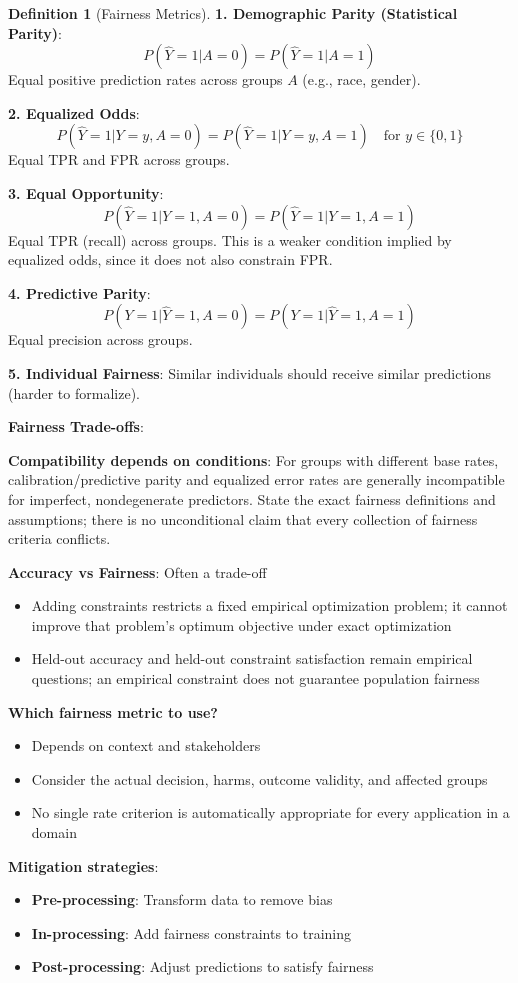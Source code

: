 \documentclass[11pt,twoside]{article}
\numberwithin{equation}{section}
\theoremstyle{plain}
\theoremstyle{definition}
\newtheorem{definition}[theorem]{Definition}
\theoremstyle{remark}
\newenvironment{keyidea}{
  \begin{tcolorbox}[colback=yellow!5!white,
                    colframe=yellow!50!black,
                    title=Key Idea,
                    breakable,
                    enhanced,
                    sharp corners,
                    boxrule=0.8pt,
                    left=6pt, right=6pt, top=6pt, bottom=6pt]
}{
  \end{tcolorbox}
}
\begin{document}
\begin{definition}[Fairness Metrics]

\textbf{1. Demographic Parity (Statistical Parity)}:
\[
P(\hat{Y} = 1 | A = 0) = P(\hat{Y} = 1 | A = 1)
\]
Equal positive prediction rates across groups $A$ (e.g., race, gender).

\textbf{2. Equalized Odds}:
\[
P(\hat{Y} = 1 | Y = y, A = 0) = P(\hat{Y} = 1 | Y = y, A = 1) \quad \text{for } y \in \{0, 1\}
\]
Equal TPR and FPR across groups.

\textbf{3. Equal Opportunity}:
\[
P(\hat{Y} = 1 | Y = 1, A = 0) = P(\hat{Y} = 1 | Y = 1, A = 1)
\]
Equal TPR (recall) across groups. This is a weaker condition implied by equalized odds, since it does not also constrain FPR.

\textbf{4. Predictive Parity}:
\[
P(Y = 1 | \hat{Y} = 1, A = 0) = P(Y = 1 | \hat{Y} = 1, A = 1)
\]
Equal precision across groups.

\textbf{5. Individual Fairness}:
Similar individuals should receive similar predictions (harder to formalize).
\end{definition}

\begin{keyidea}
\textbf{Fairness Trade-offs}:

\textbf{Compatibility depends on conditions}: For groups with different base rates, calibration/predictive parity and equalized error rates are generally incompatible for imperfect, nondegenerate predictors. State the exact fairness definitions and assumptions; there is no unconditional claim that every collection of fairness criteria conflicts.

\textbf{Accuracy vs Fairness}: Often a trade-off
\begin{itemize}
\item Adding constraints restricts a fixed empirical optimization problem; it cannot improve that problem's optimum objective under exact optimization
\item Held-out accuracy and held-out constraint satisfaction remain empirical questions; an empirical constraint does not guarantee population fairness
\end{itemize}

\textbf{Which fairness metric to use?}
\begin{itemize}
\item Depends on context and stakeholders
\item Consider the actual decision, harms, outcome validity, and affected groups
\item No single rate criterion is automatically appropriate for every application in a domain
\end{itemize}

\textbf{Mitigation strategies}:
\begin{itemize}
\item \textbf{Pre-processing}: Transform data to remove bias
\item \textbf{In-processing}: Add fairness constraints to training
\item \textbf{Post-processing}: Adjust predictions to satisfy fairness
\end{itemize}
\end{keyidea}
\end{document}
